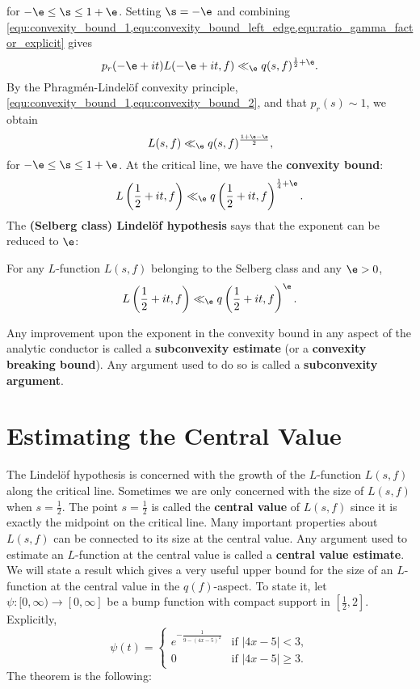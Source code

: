     for $-\e \le \s \le 1+\e$. Setting $\s = -\e$ and combining \cref{equ:convexity_bound_1,equ:convexity_bound_left_edge,equ:ratio_gamma_factor_explicit} gives
    \begin{equation}\label{equ:convexity_bound_2}
      p_{r}(-\e+it)L(-\e+it,f) \ll_{\e} q(s,f)^{\frac{1}{2}+\e}.
    \end{equation}
    By the Phragm\'en-Lindel\"of convexity principle, \cref{equ:convexity_bound_1,equ:convexity_bound_2}, and that $p_{r}(s) \sim 1$, we obtain
    \[
      L(s,f) \ll_{\e} q(s,f)^{\frac{1+\e-\s}{2}},
    \]
    for $-\e \le \s \le 1+\e$. At the critical line, we have the \textbf{convexity bound}:
    \begin{equation}\label{equ:convexity_bound_L_function}
      L\left(\frac{1}{2}+it,f\right) \ll_{\e} q\left(\frac{1}{2}+it,f\right)^{\frac{1}{4}+\e}.
    \end{equation}
    The \textbf{(Selberg class) Lindel\"of hypothesis} says that the exponent can be reduced to $\e$:

    \begin{conjecture}
      For any $L$-function $L(s,f)$ belonging to the Selberg class and any $\e > 0$,
      \[
        L\left(\frac{1}{2}+it,f\right) \ll_{\e} q\left(\frac{1}{2}+it,f\right)^{\e}.
      \]
    \end{conjecture}

    Any improvement upon the exponent in the convexity bound in any aspect of the analytic conductor is called a \textbf{subconvexity estimate} (or a \textbf{convexity breaking bound}). Any argument used to do so is called a \textbf{subconvexity argument}.
  \section{Estimating the Central Value}
    The Lindel\"of hypothesis is concerned with the growth of the $L$-function $L(s,f)$ along the critical line. Sometimes we are only concerned with the size of $L(s,f)$ when $s = \frac{1}{2}$. The point $s = \frac{1}{2}$ is called the \textbf{central value} of $L(s,f)$ since it is exactly the midpoint on the critical line. Many important properties about $L(s,f)$ can be connected to its size at the central value. Any argument used to estimate an $L$-function at the central value is called a \textbf{central value estimate}. We will state a result which gives a very useful upper bound for the size of an $L$-function at the central value in the $q(f)$-aspect. To state it, let $\psi:[0,\infty) \to [0,\infty]$ be a bump function with compact support in $\left[\frac{1}{2},2\right]$. Explicitly,
    \[
      \psi(t) = \begin{cases} e^{-\frac{1}{9-(4x-5)^{2}}} & \text{if $|4x-5| < 3$}, \\ 0 & \text{if $|4x-5| \ge 3$}. \end{cases}
    \]
    The theorem is the following:

